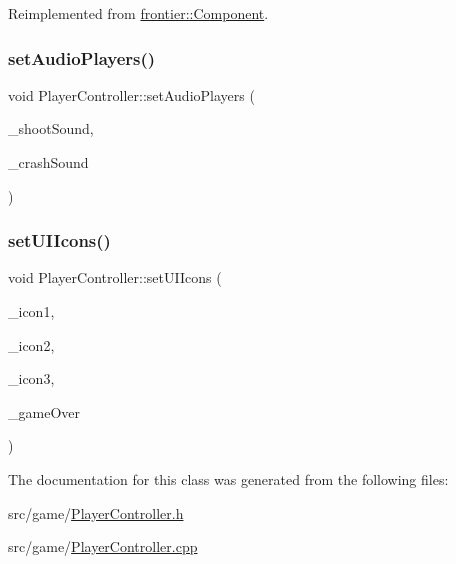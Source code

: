 Reimplemented from \hyperlink{classfrontier_1_1_component_ab920f9bc07ce051ebb5559c5a66508d1}{frontier\+::\+Component}.

\mbox{\label{class_player_controller_a9bceb77b4a1d71290cc057ab16b64e8b}} 
\subsubsection{\texorpdfstring{set\+Audio\+Players()}{setAudioPlayers()}}
{\footnotesize\ttfamily void Player\+Controller\+::set\+Audio\+Players (\begin{DoxyParamCaption}\item[{std\+::weak\+\_\+ptr$<$ \hyperlink{classfrontier_1_1_audio_player}{frontier\+::\+Audio\+Player} $>$}]{\+\_\+shoot\+Sound,  }\item[{std\+::weak\+\_\+ptr$<$ \hyperlink{classfrontier_1_1_audio_player}{frontier\+::\+Audio\+Player} $>$}]{\+\_\+crash\+Sound }\end{DoxyParamCaption})}

\mbox{\label{class_player_controller_a6fe2f80c8a3bac13c044e848b12f86ab}} 
\subsubsection{\texorpdfstring{set\+U\+I\+Icons()}{setUIIcons()}}
{\footnotesize\ttfamily void Player\+Controller\+::set\+U\+I\+Icons (\begin{DoxyParamCaption}\item[{std\+::weak\+\_\+ptr$<$ \hyperlink{classfrontier_1_1_entity}{frontier\+::\+Entity} $>$}]{\+\_\+icon1,  }\item[{std\+::weak\+\_\+ptr$<$ \hyperlink{classfrontier_1_1_entity}{frontier\+::\+Entity} $>$}]{\+\_\+icon2,  }\item[{std\+::weak\+\_\+ptr$<$ \hyperlink{classfrontier_1_1_entity}{frontier\+::\+Entity} $>$}]{\+\_\+icon3,  }\item[{std\+::weak\+\_\+ptr$<$ \hyperlink{classfrontier_1_1_entity}{frontier\+::\+Entity} $>$}]{\+\_\+game\+Over }\end{DoxyParamCaption})}



The documentation for this class was generated from the following files\+:\begin{DoxyCompactItemize}
\item 
src/game/\hyperlink{_player_controller_8h}{Player\+Controller.\+h}\item 
src/game/\hyperlink{_player_controller_8cpp}{Player\+Controller.\+cpp}\end{DoxyCompactItemize}
